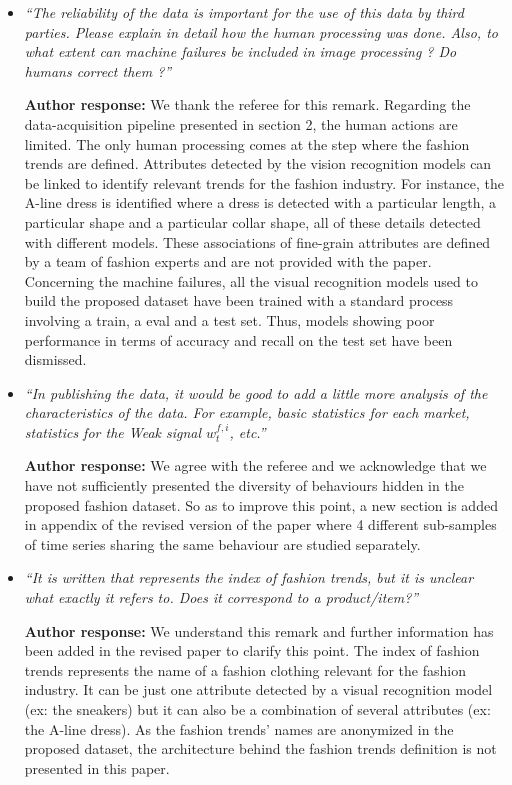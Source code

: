 \documentclass[10pt]{article} %
\begin{document}
\begin{itemize}
	\item {\em ``The reliability of the data is important for the use of this data by third parties. Please explain in detail how the human processing was done. Also, to what extent can machine failures be included in image processing ? Do humans correct them ?''} \medskip
	
	\textbf{Author response:} We thank the referee for this remark. Regarding the data-acquisition pipeline presented in section 2, the human actions are limited. The only human processing comes at the step where the fashion trends are defined. Attributes detected by the vision recognition models can be linked to identify relevant trends for the fashion industry. For instance, the A-line dress is identified where a dress is detected with a particular length, a particular shape and a particular collar shape, all of these details detected with different models. These associations of fine-grain attributes are defined by a team of fashion experts and are not provided with the paper. Concerning the machine failures, all the visual recognition models used to build the proposed dataset have been trained with a standard process involving a train, a eval and a test set. Thus, models showing poor performance in terms of accuracy and recall on the test set have been dismissed.\\
	
	\item {\em ``In publishing the data, it would be good to add a little more analysis of the characteristics of the data. For example, basic statistics for each market, statistics for the Weak signal $w^{f,i}_t$, etc.''} \medskip
	
	\textbf{Author response:} We agree with the referee and we acknowledge that we have not sufficiently presented the diversity of behaviours hidden in the proposed fashion dataset. So as to improve this point, a new section is added in appendix of the revised version of the paper where 4 different sub-samples of time series sharing the same behaviour are studied separately. \\
	
	\item {\em ``It is written that represents the index of fashion trends, but it is unclear what exactly it refers to. Does it correspond to a product/item?''} \medskip

	\textbf{Author response:} We understand this remark and further information has been added in the revised paper to clarify this point. The index of fashion trends represents the name of a fashion clothing relevant for the fashion industry. It can be just one attribute detected by a visual recognition model (ex: the sneakers) but it can also be a combination of several attributes (ex: the A-line dress). As the fashion trends' names are anonymized in the proposed dataset, the architecture behind the fashion trends definition is not presented in this paper.\\
	

\end{itemize}
\end{document}
